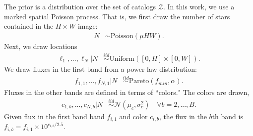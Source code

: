 The prior is a distribution over the set of catalogs $\mathcal{Z}$. In this work, we use a marked spatial Poisson process. That is, we first draw the number of stars contained in the $H\times W$ image:
\begin{align}
	N &\sim \text{Poisson}(\mu HW).
\end{align}
Next, we draw locations
\begin{align}
  \ell_1, ..., \ell_N | N &\stackrel{iid}{\sim} \text{Uniform}([0, H] \times [0, W]). 
 \end{align}
We draw fluxes in the first band from a power law distribution:
\begin{align}
    f_{1, 1}, ..., f_{N,1} | N & 
    \stackrel{iid}{\sim} \text{Pareto}(f_{min}, \alpha) 
    \label{eq:flux_prior}.
\end{align}
Fluxes in the other bands are defined in terms of ``colors." The colors are drawn,
\begin{align}
  c_{1, b}, ..., c_{N,b} | N  & 
      \stackrel{iid}{\sim} \mathcal{N}(\mu_c, \sigma^2_c) \quad \forall b = 2, ..., B.
\end{align}
Given flux in the first band band $f_{i,1}$ and color $c_{i,b}$,
the flux in the $b$th band is  $f_{i,b} = f_{i,1} \times 10^{c_{i,b} / 2.5}$.




